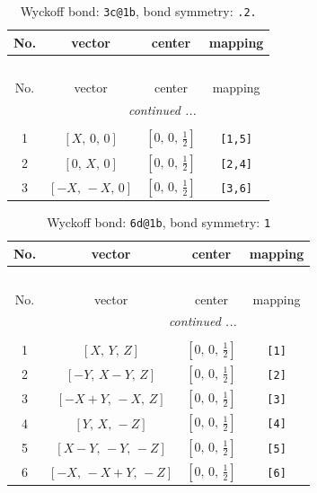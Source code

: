 \documentclass[fleqn,8pt]{jsarticle}
\begin{document}
\begin{longtable}{cccc}
\caption{Wyckoff bond: {\tt 3c@1b}, bond symmetry: {\tt .2.}}
 \\
 \hline \hline
No. & vector & center & mapping \\ \hline \endfirsthead

\multicolumn{3}{l}{\tablename\ \thetable{}} \\
 \hline \hline
No. & vector & center & mapping \\ \hline \endhead

 \hline \hline
\multicolumn{3}{r}{\footnotesize\it continued ...} \\ \endfoot

 \hline \hline
\multicolumn{3}{r}{} \\ \endlastfoot

1 & $\left[ X,\, 0,\, 0 \right]$ & $\left[ 0,\, 0,\, \frac{1}{2} \right]$ & {\tt [1,5]} \\ \hline
2 & $\left[ 0,\, X,\, 0 \right]$ & $\left[ 0,\, 0,\, \frac{1}{2} \right]$ & {\tt [2,4]} \\ \hline
3 & $\left[ - X,\, - X,\, 0 \right]$ & $\left[ 0,\, 0,\, \frac{1}{2} \right]$ & {\tt [3,6]} \\
\end{longtable}
\renewcommand{\arraystretch}{1.2}
\begin{longtable}{cccc}
\caption{Wyckoff bond: {\tt 6d@1b}, bond symmetry: {\tt 1}}
 \\
 \hline \hline
No. & vector & center & mapping \\ \hline \endfirsthead

\multicolumn{3}{l}{\tablename\ \thetable{}} \\
 \hline \hline
No. & vector & center & mapping \\ \hline \endhead

 \hline \hline
\multicolumn{3}{r}{\footnotesize\it continued ...} \\ \endfoot

 \hline \hline
\multicolumn{3}{r}{} \\ \endlastfoot

1 & $\left[ X,\, Y,\, Z \right]$ & $\left[ 0,\, 0,\, \frac{1}{2} \right]$ & {\tt [1]} \\ \hline
2 & $\left[ - Y,\, X - Y,\, Z \right]$ & $\left[ 0,\, 0,\, \frac{1}{2} \right]$ & {\tt [2]} \\ \hline
3 & $\left[ - X + Y,\, - X,\, Z \right]$ & $\left[ 0,\, 0,\, \frac{1}{2} \right]$ & {\tt [3]} \\ \hline
4 & $\left[ Y,\, X,\, - Z \right]$ & $\left[ 0,\, 0,\, \frac{1}{2} \right]$ & {\tt [4]} \\ \hline
5 & $\left[ X - Y,\, - Y,\, - Z \right]$ & $\left[ 0,\, 0,\, \frac{1}{2} \right]$ & {\tt [5]} \\ \hline
6 & $\left[ - X,\, - X + Y,\, - Z \right]$ & $\left[ 0,\, 0,\, \frac{1}{2} \right]$ & {\tt [6]} \\
\end{longtable}
\end{document}
